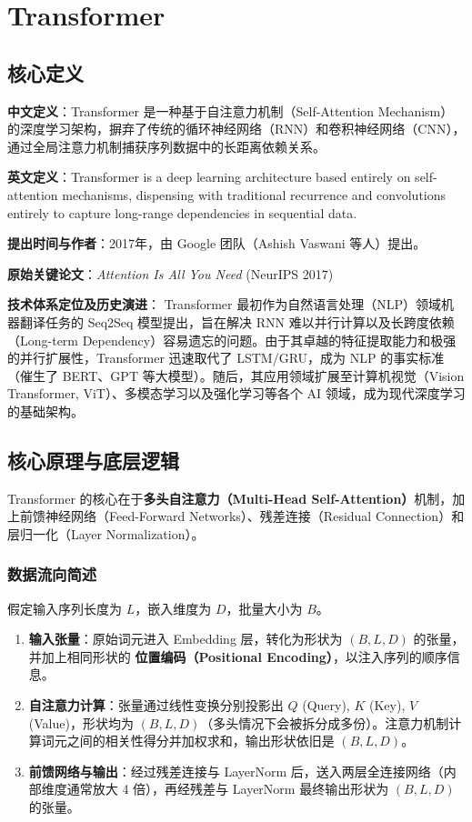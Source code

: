 \documentclass[12pt, a4paper]{book}
\begin{document}
\chapter{Transformer}


\section{核心定义}
\textbf{中文定义}：Transformer 是一种基于自注意力机制（Self-Attention Mechanism）的深度学习架构，摒弃了传统的循环神经网络（RNN）和卷积神经网络（CNN），通过全局注意力机制捕获序列数据中的长距离依赖关系。

\textbf{英文定义}：Transformer is a deep learning architecture based entirely on self-attention mechanisms, dispensing with traditional recurrence and convolutions entirely to capture long-range dependencies in sequential data.

\textbf{提出时间与作者}：2017年，由 Google 团队（Ashish Vaswani 等人）提出。

\textbf{原始关键论文}：\textit{Attention Is All You Need} (NeurIPS 2017)

\textbf{技术体系定位及历史演进}：
Transformer 最初作为自然语言处理（NLP）领域机器翻译任务的 Seq2Seq 模型提出，旨在解决 RNN 难以并行计算以及长跨度依赖（Long-term Dependency）容易遗忘的问题。由于其卓越的特征提取能力和极强的并行扩展性，Transformer 迅速取代了 LSTM/GRU，成为 NLP 的事实标准（催生了 BERT、GPT 等大模型）。随后，其应用领域扩展至计算机视觉（Vision Transformer, ViT）、多模态学习以及强化学习等各个 AI 领域，成为现代深度学习的基础架构。

\section{核心原理与底层逻辑}
Transformer 的核心在于\textbf{多头自注意力（Multi-Head Self-Attention）}机制，加上前馈神经网络（Feed-Forward Networks）、残差连接（Residual Connection）和层归一化（Layer Normalization）。

\subsection{数据流向简述}
假定输入序列长度为 $L$，嵌入维度为 $D$，批量大小为 $B$。
\begin{enumerate}
    \item \textbf{输入张量}：原始词元进入 Embedding 层，转化为形状为 $(B, L, D)$ 的张量，并加上相同形状的 \textbf{位置编码（Positional Encoding）}，以注入序列的顺序信息。
    \item \textbf{自注意力计算}：张量通过线性变换分别投影出 $Q$ (Query), $K$ (Key), $V$ (Value)，形状均为 $(B, L, D)$（多头情况下会被拆分成多份）。注意力机制计算词元之间的相关性得分并加权求和，输出形状依旧是 $(B, L, D)$。
    \item \textbf{前馈网络与输出}：经过残差连接与 LayerNorm 后，送入两层全连接网络（内部维度通常放大 4 倍），再经残差与 LayerNorm 最终输出形状为 $(B, L, D)$ 的张量。
\end{enumerate}
\end{document}
